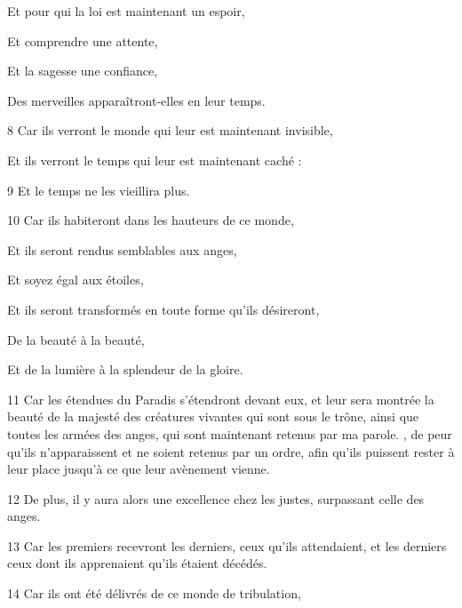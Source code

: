 \par Et pour qui la loi est maintenant un espoir,

\par Et comprendre une attente,

\par Et la sagesse une confiance,

\par Des merveilles apparaîtront-elles en leur temps.

\par 8 Car ils verront le monde qui leur est maintenant invisible,

\par Et ils verront le temps qui leur est maintenant caché :

\par 9 Et le temps ne les vieillira plus.

\par 10 Car ils habiteront dans les hauteurs de ce monde,

\par Et ils seront rendus semblables aux anges,

\par Et soyez égal aux étoiles,

\par Et ils seront transformés en toute forme qu'ils désireront,

\par De la beauté à la beauté,

\par Et de la lumière à la splendeur de la gloire.

\par 11 Car les étendues du Paradis s'étendront devant eux, et leur sera montrée la beauté de la majesté des créatures vivantes qui sont sous le trône, ainsi que toutes les armées des anges, qui sont maintenant retenus par ma parole. , de peur qu'ils n'apparaissent et ne soient retenus par un ordre, afin qu'ils puissent rester à leur place jusqu'à ce que leur avènement vienne.

\par 12 De plus, il y aura alors une excellence chez les justes, surpassant celle des anges.

\par 13 Car les premiers recevront les derniers, ceux qu'ils attendaient, et les derniers ceux dont ils apprenaient qu'ils étaient décédés.

\par 14 Car ils ont été délivrés de ce monde de tribulation,

